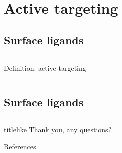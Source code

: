 \documentclass[aspectratio=169,compress]{beamer}
\renewcommand*{\bibfont}{\tiny}
\newcommand*{\autotitle}{\subsecname\hfill\textbf{\small\secname}}
\begin{document}
\section{Active targeting}

\subsection{Surface ligands}

\begin{frame}{\autotitle}
  \begin{columns}
      \begin{block}{Definition: active targeting} 
      \end{block}

  \end{columns}
\end{frame}


\subsection{Surface ligands}

\begin{frame}{\autotitle}
  \begin{columns}

  \end{columns}
\end{frame}

\begin{frame}
  \begin{beamercolorbox}[rounded=true,shadow=true,sep=8pt]{titlelike}\centering\Large
    Thank you, any questions?
  \end{beamercolorbox}
  \vfill
  \begin{block}{References}\bibfont
  \end{block}
\end{frame}
\end{document}
